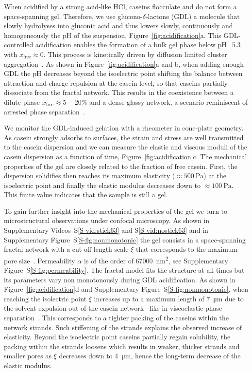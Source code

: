 \documentclass[twocolumn,superscriptaddress,showpacs,preprintnumbers, amsmath,amssymb,prl]{revtex4-1}
\begin{document}

When acidified by a strong acid-like HCl, caseins flocculate and do not form a space-spanning gel. Therefore, we use glucono-$\delta$-lactone (GDL) a molecule that slowly hydrolyses into gluconic acid and thus lowers slowly, continuously and homogeneously the pH of the suspension, Figure~\ref{fig:acidification}a. This GDL-controlled acidification enables the formation of a bulk gel phase below pH=5.3 with $x_\text{free}\approx 0$. This process is kinetically driven by diffusion limited cluster aggregation~\cite{Bremer1989}. As shown in Figure~\ref{fig:acidification}a and b, when adding enough GDL the pH decreases beyond the isoelectric point shifting the balance between attraction and charge repulsion at the casein level, so that caseins partially dissociate from the fractal network. This results in the coexistence between a dilute phase $x_\text{free}\approx 5-20\%$ and a dense glassy network, a scenario reminiscent of arrested phase separation~\cite{Cardinaux2007,lu2008gelation}.

We monitor the GDL-induced gelation with a rheometer in cone-plate geometry. As casein strongly adsorbs to surfaces, the strain and stress are well transmitted to the casein dispersion and we can measure the elastic and viscous moduli of the casein dispersion as a function of time, Figure~\ref{fig:acidification}c. The mechanical properties of the gel are closely related to the fraction of free casein. First, the dispersion solidifies then reaches its maximum elasticity ($\approx\SI{500}{\pascal}$) at the isoelectric point and finally the elastic modulus decreases down to $\approx\SI{100}{\pascal}$. This finite value indicates that the sample is still a gel.

To gain further insight into the mechanical properties of the gel we turn to microstructural observations under confocal microscopy. As shown in Supplementary Videos~S\ref{S-vid:stick63} and S\ref{S-vid:nostick63} and in Supplementary Figure~S\ref{S-fig:nonmonotonic} the gel consists in a space-spanning fractal network with a cut-off length scale $\xi$ that corresponds to the maximum pore size~\cite{VanDijk1986}. Permeability $\alpha$ is of the order of \SI{67000}{\square\nano\metre}, see Supplementary Figure~S\ref{S-fig:permeability}. The fractal model fits the structure at all times but its parameters vary non monotonously during GDL acidification. As shown in Figure~\ref{fig:acidification}d and Supplementary Figure~S\ref{S-fig:nonmonotonic}, when reaching the isolectric point $\xi$ increases up to a maximum length of \SI{7}{\micro\metre} due to the solvent expulsion out of the casein network~\cite{Lucey1998} like in viscoelastic phase separation~\cite{Tanaka2000h}. This corresponds to a tighter packing of the caseins within the network strands. Such stiffening of the strands explains the observed increase of elasticity. Beyond the isoelectric point caseins partially regain solubility, the packing within the strands loosens which results in weaker, thicker strands and smaller pores as $\xi$ decreases down to \SI{4}{\micro\metre}, hence the long-term decrease of the elastic modulus.
\end{document}
